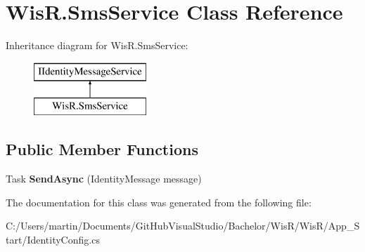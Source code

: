 \hypertarget{class_wis_r_1_1_sms_service}{}\section{Wis\+R.\+Sms\+Service Class Reference}
\label{class_wis_r_1_1_sms_service}
Inheritance diagram for Wis\+R.\+Sms\+Service\+:\begin{figure}[H]
\begin{center}
\leavevmode
\includegraphics[height=2.000000cm]{class_wis_r_1_1_sms_service}
\end{center}
\end{figure}
\subsection*{Public Member Functions}
\begin{DoxyCompactItemize}
\item 
\hypertarget{class_wis_r_1_1_sms_service_ad3685bf9078d858e42ace0ed89508c1c}{}Task {\bfseries Send\+Async} (Identity\+Message message)\label{class_wis_r_1_1_sms_service_ad3685bf9078d858e42ace0ed89508c1c}

\end{DoxyCompactItemize}


The documentation for this class was generated from the following file\+:\begin{DoxyCompactItemize}
\item 
C\+:/\+Users/martin/\+Documents/\+Git\+Hub\+Visual\+Studio/\+Bachelor/\+Wis\+R/\+Wis\+R/\+App\+\_\+\+Start/Identity\+Config.\+cs\end{DoxyCompactItemize}
